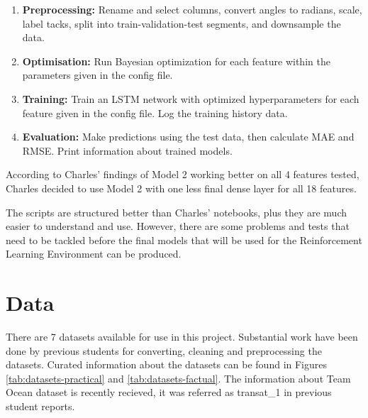 \documentclass[12pt,twoside]{report}
\begin{document}
\begin{enumerate}
  \item \textbf{Preprocessing:} Rename and select columns, convert angles to radians, scale, label tacks, split into train-validation-test segments, and downsample the data.
  \item \textbf{Optimisation:} Run Bayesian optimization for each feature within the parameters given in the config file.
  \item \textbf{Training:} Train an LSTM network with optimized hyperparameters for each feature given in the config file. Log the training history data.
  \item \textbf{Evaluation:} Make predictions using the test data, then calculate MAE and RMSE. Print information about trained models.
\end{enumerate}

According to Charles' findings of Model 2 working better on all 4 features tested, Charles decided to use Model 2 with one less final dense layer for all 18 features.

The scripts are structured better than Charles' notebooks, plus they are much easier to understand and use. However, there are some problems and tests that need to be tackled before the final models that will be used for the Reinforcement Learning Environment can be produced.


%

\chapter{Data}

There are 7 datasets available for use in this project. Substantial work have been done by previous students for converting, cleaning and preprocessing the datasets. Curated information about the datasets can be found in Figures \ref{tab:datasets-practical} and \ref{tab:datasets-factual}. The information about Team Ocean dataset is recently recieved, it was referred as transat\_1 in previous student reports. 
\end{document}
